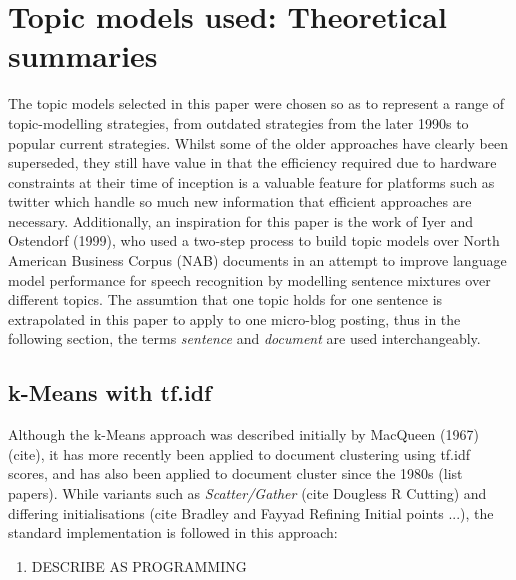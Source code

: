 \documentclass{article}
\begin{document}
\section {Topic models used: Theoretical summaries}
The topic models selected in this paper were chosen so as to represent a range of topic-modelling strategies, from outdated strategies from the later 1990s to popular current strategies. Whilst some of the older approaches have clearly been superseded, they still have value in that the efficiency required due to hardware constraints at their time of inception is a valuable feature for platforms such as twitter which handle so much new information that efficient approaches are necessary. 
Additionally, an inspiration for this paper is the work of Iyer and Ostendorf (1999), who used a two-step process to build topic models over North American Business Corpus (NAB) documents in an attempt to improve language model performance for speech recognition  by modelling sentence mixtures over different topics. The assumtion that one topic holds for one sentence is extrapolated in this paper to apply to one micro-blog posting, thus in the following section, the terms \textit{sentence} and \textit{document} are used interchangeably.

\subsection{k-Means with tf.idf}
Although the k-Means approach was described initially by MacQueen (1967)(cite), it has more recently been applied to document clustering using tf.idf scores, and has also been applied to document cluster since the 1980s (list papers). While variants such as \textit{Scatter/Gather} (cite Dougless R Cutting) and differing initialisations (cite Bradley and Fayyad Refining Initial points ...), the standard implementation is followed in this approach:
\begin{enumerate}
	\item DESCRIBE AS PROGRAMMING
\end{enumerate}
\end{document}
